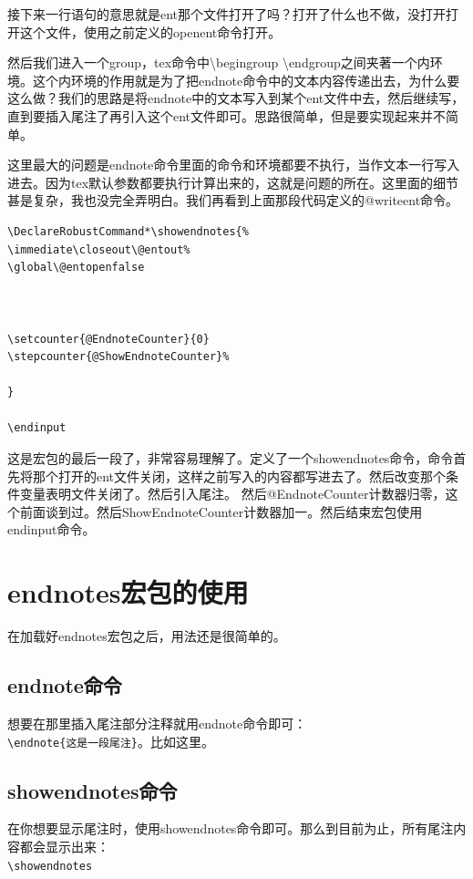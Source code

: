 \documentclass[11pt,oneside]{book}
\begin{document}
接下来一行语句的意思就是ent那个文件打开了吗？打开了什么也不做，没打开打开这个文件，使用之前定义的openent命令打开。

然后我们进入一个group，tex命令中\textbackslash begingroup \textbackslash endgroup之间夹著一个内环境。这个内环境的作用就是为了把endnote命令中的文本内容传递出去，为什么要这么做？我们的思路是将endnote中的文本写入到某个ent文件中去，然后继续写，直到要插入尾注了再引入这个ent文件即可。思路很简单，但是要实现起来并不简单。

这里最大的问题是endnote命令里面的命令和环境都要不执行，当作文本一行写入进去。因为tex默认参数都要执行计算出来的，这就是问题的所在。这里面的细节甚是复杂，我也没完全弄明白。我们再看到上面那段代码定义的@writeent命令。


\begin{Verbatim}
\DeclareRobustCommand*\showendnotes{%
\immediate\closeout\@entout%
\global\@entopenfalse



\setcounter{@EndnoteCounter}{0}
\stepcounter{@ShowEndnoteCounter}%

}

\endinput
\end{Verbatim}
这是宏包的最后一段了，非常容易理解了。定义了一个showendnotes命令，命令首先将那个打开的ent文件关闭，这样之前写入的内容都写进去了。然后改变那个条件变量表明文件关闭了。然后引入尾注。
然后@EndnoteCounter计数器归零，这个前面谈到过。然后ShowEndnoteCounter计数器加一。然后结束宏包使用endinput命令。


\section{endnotes宏包的使用}
在加载好endnotes宏包之后，用法还是很简单的。

\subsection{endnote命令}
想要在那里插入尾注部分注释就用endnote命令即可：\\
\verb+\endnote{这是一段尾注}+。比如这里。

\subsection{showendnotes命令}
在你想要显示尾注时，使用showendnotes命令即可。那么到目前为止，所有尾注内容都会显示出来：\\
\verb+\showendnotes+
\end{document}
